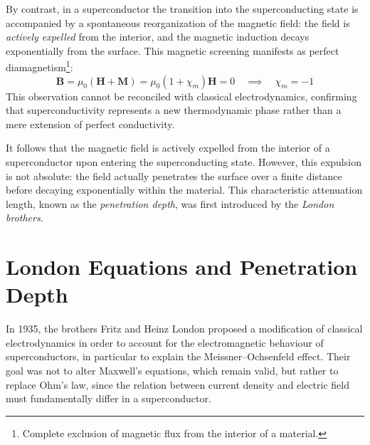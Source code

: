 By contrast, in a superconductor the transition into the superconducting state is accompanied by a spontaneous reorganization of the magnetic field: the field is \textit{actively expelled} from the interior, and the magnetic induction decays exponentially from the surface. 
This magnetic screening manifests as perfect diamagnetism\footnote{Complete exclusion of magnetic flux from the interior of a material.}:
\begin{equation}
    \mathbf{B} = \mu_0 (\mathbf{H} + \mathbf{M}) 
    = \mu_0 \left (1 + \chi_m \right) \mathbf{H} = 0 \quad \implies \quad \chi_m = -1
\end{equation}
This observation cannot be reconciled with classical electrodynamics, confirming that superconductivity represents a new thermodynamic phase rather than a mere extension of perfect conductivity.

It follows that the magnetic field is actively expelled from the interior of a superconductor upon entering the superconducting state.
However, this expulsion is not absolute: the field actually penetrates the surface over a finite distance before decaying exponentially within the material.
This characteristic attenuation length, known as the \textit{penetration depth}, was first introduced by the \textit{London brothers}.


\section{London Equations and Penetration Depth}
\label{Lond_eq}
In 1935, the brothers Fritz and Heinz London proposed a modification of classical electrodynamics in order to account for the electromagnetic behaviour of superconductors, in particular to explain the Meissner--Ochsenfeld effect. 
Their goal was not to alter Maxwell’s equations, which remain valid, but rather to replace Ohm’s law, since the relation between current density and electric field must fundamentally differ in a superconductor. 

